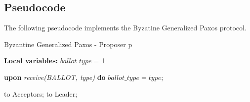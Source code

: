 \subsection{Pseudocode}
The following pseudocode implements the Byzatine Generalized Paxos protocol.%

\begin{algorithm}
	\caption{Byzantine Generalized Paxos - Proposer p}
	\textbf{Local variables:} $ballot\_type = \bot$
	\begin{algorithmic}[1]
			
		\State \textbf{upon} \textit{receive(BALLOT, type)} \textbf{do} 
		\State \hspace{\algorithmicindent} $ballot\_type = type$;
		\State
		
		\State {} to Acceptors;
		\Else
		\State {} to Leader;
		\EndIf
		\EndFunction
		
	\end{algorithmic}
\end{algorithm}


